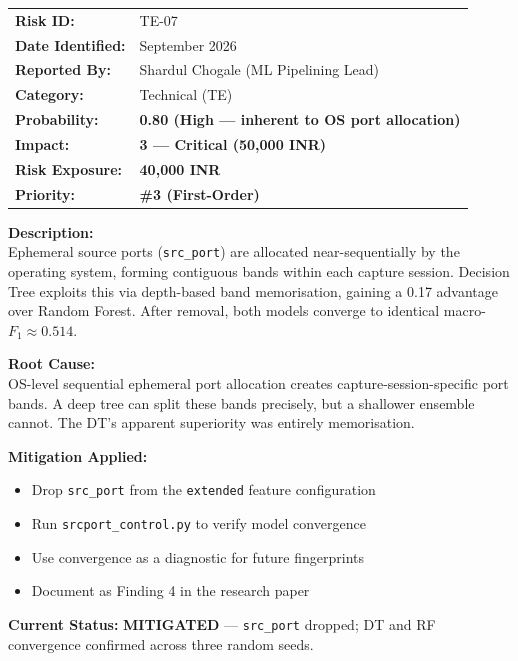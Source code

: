 \documentclass[11pt, a4paper]{article}
\newcommand{\cmark}{\textcolor{accent}{\ding{51}}}
\newcommand{\col}[1]{\texttt{\small #1}}
\begin{document}
\vspace{1.5em}

\begin{risksheet}

\begin{tabular}{@{}p{3.5cm}p{10cm}@{}}
\textbf{Risk ID:} & TE-07 \\[0.3em]
\textbf{Date Identified:} & September 2026 \\[0.3em]
\textbf{Reported By:} & Shardul Chogale (ML Pipelining Lead) \\[0.3em]
\textbf{Category:} & Technical (TE) \\[0.3em]
\textbf{Probability:} & \textcolor{medrisk}{\textbf{0.80 (High --- inherent to OS port allocation)}} \\[0.3em]
\textbf{Impact:} & \textcolor{medrisk}{\textbf{3 --- Critical (50,000 INR)}} \\[0.3em]
\textbf{Risk Exposure:} & \textcolor{medrisk}{\textbf{40,000 INR}} \\[0.3em]
\textbf{Priority:} & \textbf{\#3 (First-Order)} \\
\end{tabular}

\vspace{0.5em}
\textbf{Description:}\\
Ephemeral source ports (\col{src\_port}) are allocated near-sequentially by the operating system, forming contiguous bands within each capture session. Decision Tree exploits this via depth-based band memorisation, gaining a 0.17 advantage over Random Forest. After removal, both models converge to identical macro-$F_1 \approx 0.514$.

\vspace{0.5em}
\textbf{Root Cause:}\\
OS-level sequential ephemeral port allocation creates capture-session-specific port bands. A deep tree can split these bands precisely, but a shallower ensemble cannot. The DT's apparent superiority was entirely memorisation.

\vspace{0.5em}
\textbf{Mitigation Applied:}
\begin{itemize}[leftmargin=*, nosep]
    \item Drop \col{src\_port} from the \col{extended} feature configuration
    \item Run \col{srcport\_control.py} to verify model convergence
    \item Use convergence as a diagnostic for future fingerprints
    \item Document as Finding 4 in the research paper
\end{itemize}

\vspace{0.5em}
\textbf{Current Status:} \cmark{} \textcolor{accent}{\textbf{MITIGATED}} --- \col{src\_port} dropped; DT and RF convergence confirmed across three random seeds.
\end{risksheet}
\end{document}
